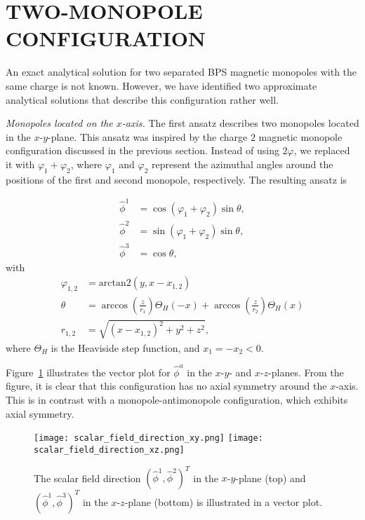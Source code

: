 \documentclass[aps, prd, twocolumn, superscriptaddress, preprintnumbers, nofootinbib, longbibliography]{revtex4-1}
\begin{document}
\section{\MakeUppercase{Two-Monopole Configuration}}
\label{sec:two-monopole-configuration}
An exact analytical solution for two separated BPS magnetic monopoles with the same charge is not known. However, we have identified two approximate analytical solutions that describe this configuration rather well.

\textit{Monopoles located on the $x$-axis.}
The first ansatz describes two monopoles located in the $x$-$y$-plane. This ansatz was inspired by the charge $2$ magnetic monopole configuration discussed in the previous section. Instead of using $2\varphi$, we replaced it with $\varphi_1 + \varphi_2$, where $\varphi_1$ and $\varphi_2$ represent the azimuthal angles around the positions of the first and second monopole, respectively. The resulting ansatz is

\begin{align}
    \hat{\phi}^1&=\cos(\varphi_1+\varphi_2)\sin\theta,\nonumber\\
    \hat{\phi}^2&=\sin(\varphi_1+\varphi_2)\sin\theta,\nonumber\\
    \hat{\phi}^3&=\cos{\theta},
\end{align}
with
\begin{align*}
    \varphi_{1,2}&=\text{arctan2}(y,x-x_{1,2})\\
    \theta&=\arccos{\left(\frac{z}{r_1}\right)}\Theta_H(-x)+\arccos{\left(\frac{z}{r_2}\right)}\Theta_H(x)\\
    r_{1,2}&=\sqrt{(x-x_{1,2})^2+y^2+z^2},
\end{align*}
where $\Theta_H$ is the Heaviside step function, and $x_1=-x_2<0$.


Figure~\ref{fig:scalar-field-direction} illustrates the vector plot for $\hat{\phi}^a$ in the $x$-$y$- and $x$-$z$-planes. From the figure, it is clear that this configuration has no axial symmetry around the $x$-axis. This is in contrast with a monopole-antimonopole configuration, which exhibits axial symmetry.

\begin{figure}[h]
    \texttt{[image: scalar\_field\_direction\_xy.png]}
    \texttt{[image: scalar\_field\_direction\_xz.png]}
    \caption{The scalar field direction $(\hat{\phi}^1, \hat{\phi}^2)^T$ in the $x$-$y$-plane (top) and $(\hat{\phi}^1, \hat{\phi}^3)^T$ in the $x$-$z$-plane (bottom) is illustrated in a vector plot.}
    \label{fig:scalar-field-direction}
\end{figure} 
\end{document}
